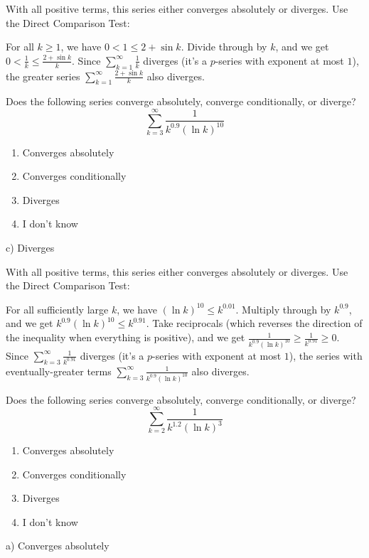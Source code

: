 \documentclass[addpoints,12pt,answers]{exam}
\begin{document}
\begin{questions}
\begin{solution}
    With all positive terms, this series either converges absolutely or diverges. Use the Direct Comparison Test:
    
    For all $k\ge 1$, we have $0<1\le 2+\sin k$. Divide through by $k$, and we get $\displaystyle 0<\frac{1}{k}\le\frac{2+\sin k}{k}$. Since $\displaystyle\sum_{k=1}^\infty \frac{1}{k}$ diverges (it's a $p$-series with exponent at most $1$), the greater series $\displaystyle\sum_{k=1}^\infty\frac{2+\sin k}{k}$ also diverges.    
  \end{solution}
  \newpage
  \question
  Does the following series converge absolutely, converge conditionally, or diverge?
  $$\sum_{k=3}^\infty\frac{1}{k^{0.9}(\ln k)^{10}}$$
  \begin{enumerate}[label=\alph*)]
    \item
    Converges absolutely
    \item
    Converges conditionally
    \item
    Diverges
    \item
    I don't know
  \end{enumerate}
  \begin{solution}
    c) Diverges
        
    With all positive terms, this series either converges absolutely or diverges. Use the Direct Comparison Test:
    
    For all sufficiently large $k$, we have $(\ln k)^{10}\le k^{0.01}$. Multiply through by $k^{0.9}$, and we get $k^{0.9}(\ln k)^{10}\le k^{0.91}$. Take reciprocals (which reverses the direction of the inequality when everything is positive), and we get $\displaystyle\frac{1}{k^{0.9}(\ln k)^{10}}\ge\frac{1}{k^{0.91}}\ge 0$. Since $\displaystyle\sum_{k=3}^\infty \frac{1}{k^{0.91}}$ diverges (it's a $p$-series with exponent at most $1$), the series with eventually-greater terms $\displaystyle\sum_{k=3}^\infty\frac{1}{k^{0.9}(\ln k)^{10}}$ also diverges.
  \end{solution}
  \newpage
  \question
  Does the following series converge absolutely, converge conditionally, or diverge?
  $$\sum_{k=2}^\infty\frac{1}{k^{1.2}(\ln k)^3}$$
  \begin{enumerate}[label=\alph*)]
    \item
    Converges absolutely
    \item
    Converges conditionally
    \item
    Diverges
    \item
    I don't know
  \end{enumerate}
  \begin{solution}
    a) Converges absolutely
        

\end{solution}
\end{questions}
\end{document}

